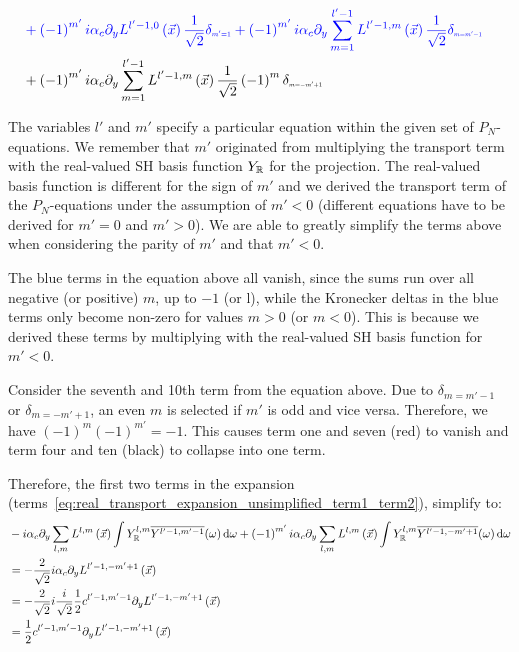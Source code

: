 \documentclass[10pt]{scrartcl}
\begin{document}
\begin{align*}
\\&
\mathcolor{blue}
{
+
\left({-1}\right)^{m'}i
}
\mathcolor{blue}
{
\alpha_c\partial_y
L^{l'-1,0}\left (\vec{x}\right)
\frac{1}{\sqrt{2}}
\delta_{\scaleto{m'=1}{4pt}}
}
\mathcolor{blue}
{
+
\left({-1}\right)^{m'}i
}
\mathcolor{blue}
{
\alpha_c\partial_y
\sum_{m=1}^{l'-1}L^{l'-1,m}\left (\vec{x}\right)
\frac{1}{\sqrt{2}}
\delta_{\scaleto{m=m'-1}{4pt}}
}
\\&
\mathcolor{black}
{
+
\left({-1}\right)^{m'}i
}
\mathcolor{black}
{
\alpha_c\partial_y
\sum_{m=1}^{l'-1}L^{l'-1,m}\left (\vec{x}\right)
\frac{1}{\sqrt{2}}
\left({-1}\right)^{m}
\delta_{\scaleto{m=-m'+1}{4pt}}
}
\end{align*}

The variables $l'$ and $m'$ specify a particular equation within the given set of $P_N$-equations. We remember that $m'$ originated from multiplying the transport term with the real-valued SH basis function $Y_{\mathbb{R}}$ for the projection. The real-valued basis function is different for the sign of $m'$ and we derived the transport term of the $P_N$-equations under the assumption of $m'<0$ (different equations have to be derived for $m'=0$ and $m'>0$). We are able to greatly simplify the terms above when considering the parity of $m'$ and that $m'<0$.

The blue terms in the equation above all vanish, since the sums run over all negative (or positive) $m$, up to $-1$ (or l), while the Kronecker deltas in the blue terms only become non-zero for values $m>0$ (or $m<0$). This is because we derived these terms by multiplying with the real-valued SH basis function for $m'<0$.

Consider the seventh and 10th term from the equation above. Due to $\delta_{m=m'-1}$ or $\delta_{m=-m'+1}$, an even $m$ is selected if $m'$ is odd and vice versa. Therefore, we have $(-1)^m(-1)^{m'}=-1$. This causes term one and seven (red) to vanish and term four and ten (black) to collapse into one term.

Therefore, the first two terms in the expansion (terms~\ref{eq:real_transport_expansion_unsimplified_term1_term2}), simplify to:
\begin{align*}
&-i\alpha_c\partial_y\sum_{l,m}L^{l,m}\left (\vec{x}\right)\int{Y_{\mathbb{R}}^{l,m}\overline{Y^{l'-1, m'-1}}(\omega )\,\mathrm{d}\omega}
+\left({-1}\right)^{m'}i\alpha_c\partial_y\sum_{l,m}L^{l,m}\left (\vec{x}\right)\int{Y_{\mathbb{R}}^{l,m}\overline{Y^{l'-1, -m'+1}}(\omega )\,\mathrm{d}\omega}
\\
&=-\frac{2}{\sqrt{2}}i
\alpha_c\partial_y
L^{l'-1,-m'+1}\left (\vec{x}\right)
\\
&=-\frac{2}{\sqrt{2}}i
\frac{i}{\sqrt{2}}\frac{1}{2}c^{{l'-1,m'-1}}
\partial_y
L^{l'-1,-m'+1}\left (\vec{x}\right)
\\
&=
\frac{1}{2}c^{{l'-1,m'-1}}
\partial_y
L^{l'-1,-m'+1}\left (\vec{x}\right)
\end{align*}
\end{document}
